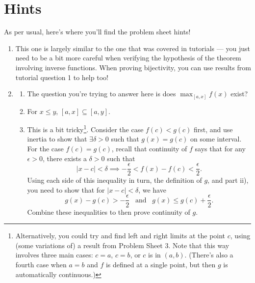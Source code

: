 \documentclass[
  10pt,
  a4paper]{article}
\providecommand{\tightlist}{%
  \setlength{\itemsep}{0pt}\setlength{\parskip}{0pt}}
\theoremstyle{plain}
\theoremstyle{definition}
\theoremstyle{plain}
\theoremstyle{plain}
\theoremstyle{plain}
\theoremstyle{plain}
\theoremstyle{definition}
\theoremstyle{definition}
\theoremstyle{remark}
\theoremstyle{remark}
\begin{document}
\hypertarget{hints}{%
\section{Hints}\label{hints}}

As per usual, here's where you'll find the problem sheet hints!

\begin{enumerate}
\def\labelenumi{\arabic{enumi})}
\item
  This one is largely similar to the one that was covered in tutorials --- you just need to be a bit more careful when verifying the hypothesis of the theorem involving inverse functions. When proving bijectivity, you can use results from tutorial question 1 to help too!
\item
  \begin{enumerate}
  \def\labelenumii{\roman{enumii})}
  \tightlist
  \item
    The question you're trying to answer here is does \(\max_{[a,x]}f(x)\) exist?
  \item
    For \(x \leq y\), \([a,x] \subseteq [a,y]\).
  \item
    This is a bit tricky\footnote{Alternatively, you could try and find left and right limits at the point \(c\), using (some variations of) a result from Problem Sheet 3. Note that this way involves three main cases: \(c = a\), \(c = b\), or \(c\) is in \((a,b)\). (There's also a fourth case when \(a = b\) and \(f\) is defined at a single point, but then \(g\) is automatically continuous.)}. Consider the case \(f(c) < g(c)\) first, and use inertia to show that \(\exists \delta > 0\) such that \(g(x) = g(c)\) on some interval. For the case \(f(c) = g(c)\), recall that continuity of \(f\) says that for any \(\epsilon > 0\), there exists a \(\delta > 0\) such that \[\lvert x - c \rvert < \delta \implies -\frac{\epsilon}{2} < f(x) - f(c) < \frac{\epsilon}{2}.\] Using each side of this inequality in turn, the definition of \(g\), and part ii), you need to show that for \(\lvert x - c \rvert < \delta\), we have \[g(x) - g(c) > -\frac{\epsilon}{2}\;\;\;\text{and}\;\;\;g(x) \leq g(c) + \frac{\epsilon}{2}.\] Combine these inequalities to then prove continuity of \(g\).
  \end{enumerate}
\end{enumerate}
\end{document}
